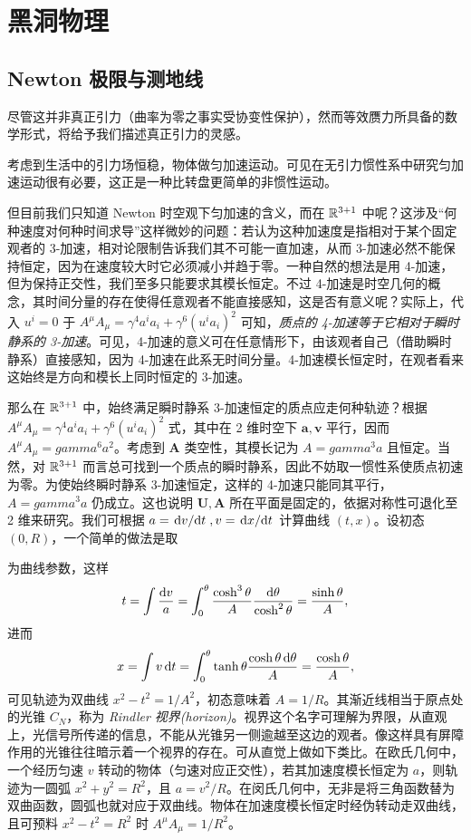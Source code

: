\chapter{黑洞物理}\label{chpt:BH}



\section{Newton 极限与测地线}
尽管这并非真正引力（曲率为零之事实受协变性保护），然而等效赝力所具备的数学形式，将给予我们描述真正引力的灵感。


考虑到生活中的引力场恒稳，物体做匀加速运动。可见在无引力惯性系中研究匀加速运动很有必要，这正是一种比转盘更简单的非惯性运动。

但目前我们只知道 Newton 时空观下匀加速的含义，而在 $\mathbb{R}^{3+1}$ 中呢？这涉及“何种速度对何种时间求导”这样微妙的问题：若认为这种加速度是指相对于某个固定观者的 3-加速，相对论限制告诉我们其不可能一直加速，从而 3-加速必然不能保持恒定，因为在速度较大时它必须减小并趋于零。一种自然的想法是用 4-加速，但为保持正交性，我们至多只能要求其模长恒定。不过 4-加速是时空几何的概念，其时间分量的存在使得任意观者不能直接感知，这是否有意义呢？实际上，代入 $u^i=0$ 于 $A^\mu A_\mu=\gamma^4 a^ia_i+\gamma^6(u^ia_i)^2$ 可知，\textit{质点的 4-加速等于它相对于瞬时静系的 3-加速}。可见，4-加速的意义可在任意情形下，由该观者自己（借助瞬时静系）直接感知，因为 4-加速在此系无时间分量。4-加速模长恒定时，在观者看来这始终是方向和模长上同时恒定的 3-加速。


那么在 $\mathbb{R}^{3+1}$ 中，始终满足瞬时静系 3-加速恒定的质点应走何种轨迹？根据 $A^\mu A_\mu=\gamma^4 a^ia_i+\gamma^6(u^ia_i)^2$ 式，其中在 2 维时空下 $\bm a,\bm v$ 平行，因而 $A^\mu A_\mu=gamma^6 a^2$。考虑到 $\bm A$ 类空性，其模长记为 $A=gamma^3a$ 且恒定。当然，对 $\mathbb{R}^{3+1}$ 而言总可找到一个质点的瞬时静系，因此不妨取一惯性系使质点初速为零。为使始终瞬时静系 3-加速恒定，这样的 4-加速只能同其平行，$A=gamma^3a$ 仍成立。这也说明 $\bm U,\bm A$ 所在平面是固定的，依据对称性可退化至 2 维来研究。我们可根据 $a=\dv*{v}{t},v=\dv*{x}{t}$ 计算曲线 $(t,x)$。设初态 $(0,R)$，一个简单的做法是取

为曲线参数，这样
\[t=\int \frac{\dd v}{a}=\int_0^\theta  \frac{\cosh^3\theta}{A}\frac{\dd\theta}{\cosh^2\theta}=\frac{\sinh\theta}{A},\]
进而
\[
x=\int v\dd{t}=\int_0^\theta \tanh\theta\frac{\cosh\theta\dd{\theta}}{A}=\frac{\cosh\theta}{A},
\]
可见轨迹为双曲线 $x^2-t^2=1/A^2$，初态意味着 $A=1/R$。其渐近线相当于原点处的光锥 $C_N$，称为 \textit{Rindler 视界(horizon)}。视界这个名字可理解为界限，从直观上，光信号所传递的信息，不能从光锥另一侧逾越至这边的观者。像这样具有屏障作用的光锥往往暗示着一个视界的存在。可从直觉上做如下类比。在欧氏几何中，一个经历匀速 $v$ 转动的物体（匀速对应正交性），若其加速度模长恒定为 $a$，则轨迹为一圆弧 $x^2+y^2=R^2$，且 $a=v^2/R$。在闵氏几何中，无非是将三角函数替为双曲函数，圆弧也就对应于双曲线。物体在加速度模长恒定时经伪转动走双曲线，且可预料 $x^2-t^2=R^2$ 时 $A^\mu A_\mu=1/R^2$。


